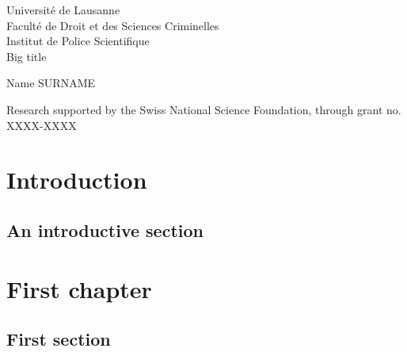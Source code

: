 \documentclass[10pt]{report}
\begin{document}
\begin{titlepage}
\begin{center}
{\large Université de Lausanne} \vspace{2 mm} \\
Faculté de Droit et des Sciences Criminelles \\
Institut de Police Scientifique \vspace{25 mm} \\

{\LARGE{Big title}}\vspace{10 mm}

\large{Name SURNAME}\vspace{150 mm}

\end{center}
Research supported by the Swiss National Science Foundation, through grant no. XXXX-XXXX

\end{titlepage}


\tableofcontents


\chapter*{Introduction}

\blindtext

\section*{An introductive section}

\blindtext


\chapter{First chapter}

\blindtext

\section{First section}

\blindtext


\end{document}
